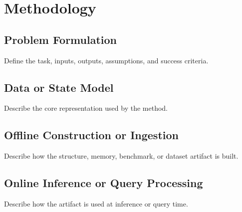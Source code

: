 \section{Methodology}

\subsection{Problem Formulation}

Define the task, inputs, outputs, assumptions, and success criteria.

\subsection{Data or State Model}

Describe the core representation used by the method.

\subsection{Offline Construction or Ingestion}

Describe how the structure, memory, benchmark, or dataset artifact is built.

\subsection{Online Inference or Query Processing}

Describe how the artifact is used at inference or query time.
